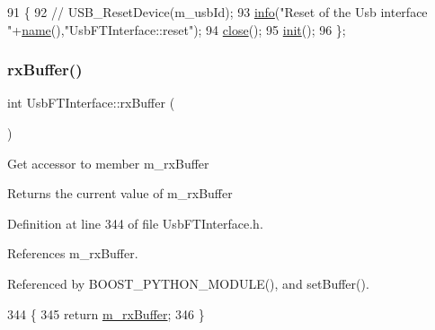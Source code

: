 \begin{DoxyCode}
91                        \{
92     \textcolor{comment}{//    USB\_ResetDevice(m\_usbId);}
93     \hyperlink{classObject_a644fd329ea4cb85f54fa6846484b84a8}{info}(\textcolor{stringliteral}{"Reset of the Usb interface "}+\hyperlink{classObject_a300f4c05dd468c7bb8b3c968868443c1}{name}(),\textcolor{stringliteral}{"UsbFTInterface::reset"});
94     \hyperlink{classUsbFTInterface_ad555e20eb4b80da1d3cac5a8c6509bb5}{close}();
95     \hyperlink{classUsbFTInterface_a5371fe7b447850599eaec81a0ffa2ba0}{init}();
96   \};
\end{DoxyCode}
\mbox{\label{classUsbFTInterface_a836d1a8d181fd49e11235bb677e3fa7e}} 
\subsubsection{\texorpdfstring{rx\+Buffer()}{rxBuffer()}}
{\footnotesize\ttfamily int Usb\+F\+T\+Interface\+::rx\+Buffer (\begin{DoxyParamCaption}{ }\end{DoxyParamCaption})\hspace{0.3cm}{\ttfamily [inline]}}

Get accessor to member m\+\_\+rx\+Buffer \begin{DoxyReturn}{Returns}
the current value of m\+\_\+rx\+Buffer 
\end{DoxyReturn}


Definition at line 344 of file Usb\+F\+T\+Interface.\+h.



References m\+\_\+rx\+Buffer.



Referenced by B\+O\+O\+S\+T\+\_\+\+P\+Y\+T\+H\+O\+N\+\_\+\+M\+O\+D\+U\+L\+E(), and set\+Buffer().


\begin{DoxyCode}
344                   \{
345     \textcolor{keywordflow}{return} \hyperlink{classUsbFTInterface_a7007c5112d381f5caefa133a42bd900d}{m\_rxBuffer};
346   \}
\end{DoxyCode}
\mbox{\label{classUsbFTInterface_ad95ffb87539ca86882e26fa24b00de97}} 
